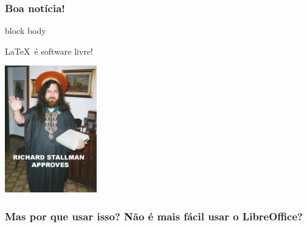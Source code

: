\documentclass{beamer}
\begin{document}
\begin{frame}
   \frametitle{Boa notícia!}
   \begin{center}
      \begin{minipage}{5cm}
        \begin{beamercolorbox}[sep=1em,wd=5cm]{block body}
            \begin{center}
               \LaTeX\ é software livre!
            \end{center}
        \end{beamercolorbox}
      \end{minipage}
      \begin{minipage}{5cm}
         \begin{center}
            \includegraphics[width=4cm]{saintignuciuscopia.jpg}
         \end{center}
      \end{minipage}
   \end{center}
\end{frame}
\begin{frame}
   \frametitle{Mas por que usar isso? Não é mais fácil usar o LibreOffice?}
   \begin{center}
      \noindent{}
   \end{center}
\end{frame}
\end{document}
